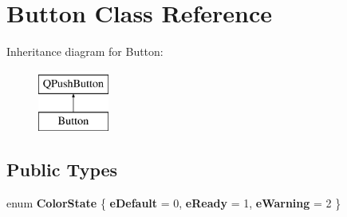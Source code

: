 \hypertarget{class_button}{\section{Button Class Reference}
\label{class_button}
}
Inheritance diagram for Button\-:\begin{figure}[H]
\begin{center}
\leavevmode
\includegraphics[height=2.000000cm]{class_button}
\end{center}
\end{figure}
\subsection*{Public Types}
\begin{DoxyCompactItemize}
\item 
enum {\bfseries Color\-State} \{ {\bfseries e\-Default} = 0, 
{\bfseries e\-Ready} = 1, 
{\bfseries e\-Warning} = 2
 \}
\end{DoxyCompactItemize}
